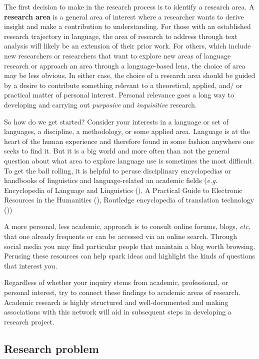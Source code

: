 \documentclass[
  letterpaper,
]{book}
\theoremstyle{definition}
\theoremstyle{remark}
\begin{document}
The first decision to make in the research process is to identify a
research area. A \textbf{research area} is a general area of interest
where a researcher wants to derive insight and make a contribution to
understanding. For those with an established research trajectory in
language, the area of research to address through text analysis will
likely be an extension of their prior work. For others, which include
new researchers or researchers that want to explore new areas of
language research or approach an area through a language-based lens, the
choice of area may be less obvious. In either case, the choice of a
research area should be guided by a desire to contribute something
relevant to a theoretical, applied, and/ or practical matter of personal
interest. Personal relevance goes a long way to developing and carrying
out \emph{purposive} and \emph{inquisitive} research.

So how do we get started? Consider your interests in a language or set
of languages, a discipline, a methodology, or some applied area.
Language is at the heart of the human experience and therefore found in
some fashion anywhere one seeks to find it. But it is a big world and
more often than not the general question about what area to explore
language use is sometimes the most difficult. To get the ball rolling,
it is helpful to peruse disciplinary encyclopedias or handbooks of
linguistics and language-related an academic fields (\emph{e.g.}
Encyclopedia of Language and Linguistics
(), A Practical Guide to Electronic
Resources in the Humanities (), Routledge encyclopedia of translation technology
())

A more personal, less academic, approach is to consult online forums,
blogs, \emph{etc}. that one already frequents or can be accessed via an
online search. Through social media you may find particular people that
maintain a blog worth browsing. Perusing these resources can help spark
ideas and highlight the kinds of questions that interest you.

Regardless of whether your inquiry stems from academic, professional, or
personal interest, try to connect these findings to academic areas of
research. Academic research is highly structured and well-documented and
making associations with this network will aid in subsequent steps in
developing a research project.

\subsection{Research problem}\label{sec-research-problem}
\end{document}
